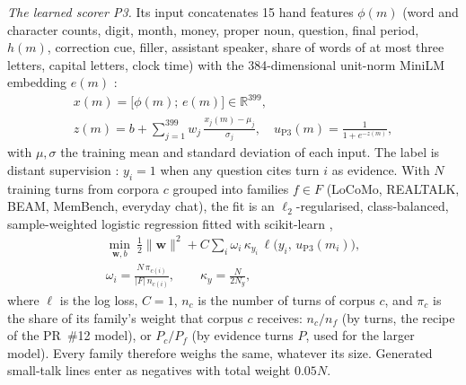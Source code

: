 \emph{The learned scorer P3.} Its input concatenates 15 hand features
$\phi(m)$ (word and character counts, digit, month, money, proper noun,
question, final period, $h(m)$, correction cue, filler, assistant speaker,
share of words of at most three letters, capital letters, clock time) with
the 384-dimensional unit-norm MiniLM embedding $e(m)$
\cite{wang2020minilm,reimers2019sbert}:
\begin{equation}
\label{eq:lr}
\begin{gathered}
x(m)=\big[\phi(m);\,e(m)\big]\in\mathbb{R}^{399},\\
z(m)=b+\sum_{j=1}^{399} w_j\,\frac{x_j(m)-\mu_j}{\sigma_j},\quad
u_{\mathrm{P3}}(m)=\frac{1}{1+e^{-z(m)}},
\end{gathered}
\end{equation}
with $\mu,\sigma$ the training mean and standard deviation of each input. The
label is distant supervision \cite{mintz2009distant}: $y_i=1$ when any question cites turn $i$ as
evidence. With $N$ training turns from corpora $c$ grouped into families
$f\in F$ (LoCoMo, REALTALK, BEAM, MemBench, everyday chat), the fit is
an $\ell_2$-regularised, class-balanced, sample-weighted logistic regression
fitted with scikit-learn \cite{pedregosa2011sklearn},
\begin{equation}
\label{eq:loss}
\begin{gathered}
\min_{\mathbf{w},b}\ \tfrac12\lVert\mathbf{w}\rVert^2
 + C\sum_{i}\omega_i\,\kappa_{y_i}\,\ell\big(y_i,\,u_{\mathrm{P3}}(m_i)\big),\\
\omega_i=\frac{N\,\pi_{c(i)}}{|F|\,n_{c(i)}},\qquad
\kappa_y=\frac{N}{2N_y},
\end{gathered}
\end{equation}
where $\ell$ is the log loss, $C=1$, $n_c$ is the number of turns of corpus
$c$, and $\pi_c$ is the share of its family's weight that corpus $c$ receives:
$n_c/n_f$ (by turns, the recipe of the PR~\#12 model), or $P_c/P_f$ (by
evidence turns $P$, used for the larger model). Every family therefore weighs
the same, whatever its size. Generated small-talk lines enter as negatives
with total weight $0.05N$.

